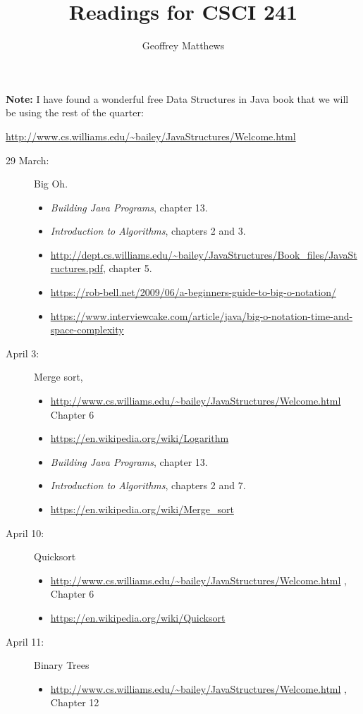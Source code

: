\documentclass{article}
\title{Readings for CSCI 241}
\author{Geoffrey Matthews}
\newcommand{\bailey}{
  \url{http://www.cs.williams.edu/~bailey/JavaStructures/Welcome.html}
  }
\begin{document}
\maketitle

{\bf Note:}  I have found a wonderful free Data Structures in Java
book that we will be using the rest of the quarter:

\url{http://www.cs.williams.edu/~bailey/JavaStructures/Welcome.html}


\begin{description}
\item[29 March:]  Big Oh.
  
  \begin{itemize}
    \item {\em Building Java Programs}, chapter 13.
    \item {\em Introduction to Algorithms}, chapters 2 and 3.
      \item \url{http://dept.cs.williams.edu/~bailey/JavaStructures/Book_files/JavaStructures.pdf}, chapter 5.
  \item \url{https://rob-bell.net/2009/06/a-beginners-guide-to-big-o-notation/}
    \item \url{https://www.interviewcake.com/article/java/big-o-notation-time-and-space-complexity}
  \end{itemize}

\item[April 3:] Merge sort,
  \begin{itemize}
    \item
      \url{http://www.cs.williams.edu/~bailey/JavaStructures/Welcome.html}
      Chapter 6
\item \url{https://en.wikipedia.org/wiki/Logarithm}
    \item {\em Building Java Programs}, chapter 13.
  \item {\em Introduction to Algorithms}, chapters 2 and 7.
  \item\url{https://en.wikipedia.org/wiki/Merge_sort}
  \end{itemize}

\item[April 10:] Quicksort
  \begin{itemize}
  \item      \bailey,      Chapter 6
  \item\url{https://en.wikipedia.org/wiki/Quicksort}
  \end{itemize}

\item[April 11:] Binary Trees
  \begin{itemize}
  \item    \bailey, Chapter  12
  \end{itemize}


\end{description}
\end{document}
